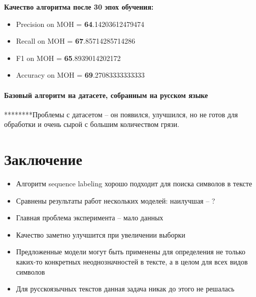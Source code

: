 \documentclass[12pt,twoside]{article}
\begin{document}
			\textbf{	Качество алгоритма после 30 эпох обучения:}
			\begin{itemize}
				\item Precision on MOH =  \textbf{64}.14203612479474
				\item Recall on MOH =  \textbf{67}.85714285714286
				\item F1 on MOH =  \textbf{65}.8939014202172
				\item Accuracy on MOH =  \textbf{69}.27083333333333
			\end{itemize}

\paragraph{Базовый алгоритм на датасете, собранным на русском языке}
********Проблемы с датасетом – он появился, улучшился, но не готов для обработки и очень сырой с большим количеством грязи.



\section{Заключение}
	\begin{itemize}
		\item Алгоритм sequence labeling хорошо подходит для поиска символов в тексте
		\item Сравнены результаты работ нескольких моделей: наилучшая – ?
		\item Главная проблема эксперимента -- мало данных
		\item Качество заметно улучшится при увеличении выборки
		\item Предложенные модели могут быть применены для определения не только каких-то конкретных неоднозначностей в тексте, а в целом для всех видов символов
		\item Для русскоязычных текстов данная задача никак до этого не решалась
	\end{itemize}
\end{document}
